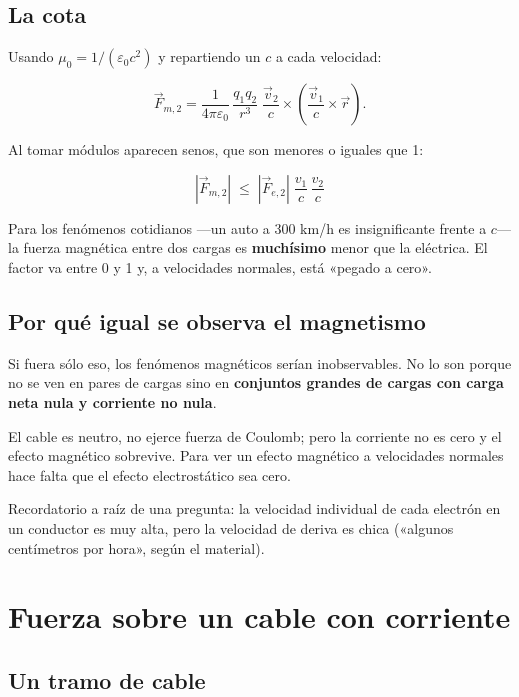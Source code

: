 \documentclass[12pt,a4paper]{article}
\begin{document}
\subsection{La cota}

Usando $\mu_0 = 1/(\varepsilon_0 c^2)$ y repartiendo un $c$ a cada velocidad:

\[
\vec F_{m,2} = \frac{1}{4\pi\varepsilon_0}\,\frac{q_1 q_2}{r^3}\;
\frac{\vec v_2}{c}\times\left(\frac{\vec v_1}{c}\times\vec r\right).
\]

Al tomar módulos aparecen senos, que son menores o iguales que 1:

\begin{keybox}
\[
\boxed{\ |\vec F_{m,2}| \;\le\; |\vec F_{e,2}|\;\frac{v_1}{c}\,\frac{v_2}{c}\ }
\]
\end{keybox}

Para los fenómenos cotidianos ---un auto a 300 km/h es insignificante frente a
$c$--- la fuerza magnética entre dos cargas es \textbf{muchísimo} menor que la
eléctrica. El factor va entre 0 y 1 y, a velocidades normales, está «pegado a
cero».

\subsection{Por qué igual se observa el magnetismo}

Si fuera sólo eso, los fenómenos magnéticos serían inobservables. No lo son
porque no se ven en pares de cargas sino en \textbf{conjuntos grandes de cargas con
carga neta nula y corriente no nula}.

\begin{notebox}
El cable es neutro, no ejerce
fuerza de Coulomb; pero la corriente no es cero y el efecto magnético
sobrevive. Para ver un efecto magnético a velocidades normales hace falta que
el efecto electrostático sea cero.
\end{notebox}

Recordatorio a raíz de una pregunta: la velocidad individual de cada electrón
en un conductor es muy alta, pero la velocidad de deriva es chica («algunos
centímetros por hora», según el material).

\section{Fuerza sobre un cable con corriente}

\subsection{Un tramo de cable}
\end{document}
